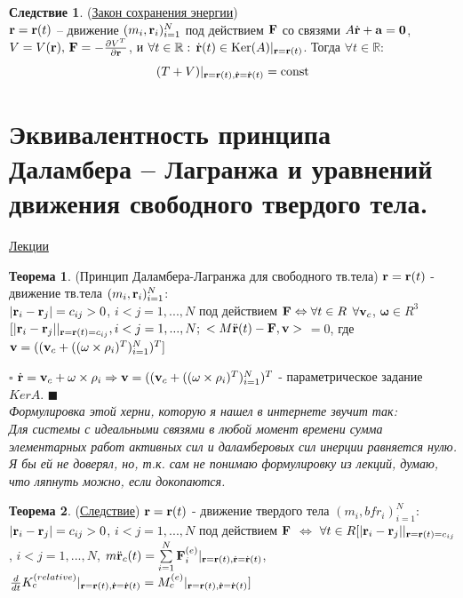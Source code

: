 \documentclass[specialist, subf, href, colorlinks=true, 12pt, times, mtpro, final]{disser}
\theoremstyle{definition}
\newtheorem{theorem}{Теорема}[section]
\newtheorem{consequence}{Следствие}[section]
\def\note{\textcolor{faded}}
\def\const{\text{const}}
\def\Ker{\text{Ker}}
\def\bfrd{\dot{\bfr}}
\def\bfomega{\mathbf{\omega}}
\def\bfrho{\mathbf{\rho}}
\def\bfzero{\mathbf{0}}
\begin{document}
    \begin{consequence} (\hyperlink{first_lects.26}{Закон сохранения энергии})\\
    $\mathbf{r}=\mathbf{r}(t)$ -- движение $(m_i, \mathbf{r}_i)_{i=1}^N$ под действием $\mathbf{F}$ со
    связями $A\bfrd+\bfa=\bfzero$, $V=V(\mathbf{r}),\, \mathbf{F}=-\frac{\partial V^T}{\partial\mathbf{r}}$,
    и $\forall t\in\mathbb{R}:\, \bfrd(t)\in\Ker(A)|_{\bfr=\bfr(t)}$. Тогда $\forall t\in\mathbb{R}$:
    $$
    (T+V)|_{\bfr=\bfr(t),\bfrd=\bfrd(t)} = \const
    $$
    \end{consequence}
    
    \section{Эквивалентность принципа Даламбера – Лагранжа и уравнений движения свободного твердого тела.}
     \label{6}
    \hyperlink {first_lects.27}{Лекции} \\
    
    \begin{theorem} (Принцип Даламбера-Лагранжа для свободного тв.тела)
    $\mathbf{r} = \mathbf{r}(t) $ - движение тв.тела $(m_i, \mathbf{r}_i)^N_{i=1}$:\\
    $|\mathbf{r}_i - \mathbf{r}_j| = c_{ij} > 0$, $i < j = 1, ..., N$ под действием 
    $\mathbf{F} \Leftrightarrow \forall t \in R$  $\forall \mathbf{v}_c$, $\bfomega \in R^3$ $[|\mathbf{r}_i - \mathbf{r}_j| |_{ \mathbf{r}=\mathbf{r}(t)=c_{ij}}, i < j = 1,...,N;$  $<M\ddot{\mathbf{r}}(t) - \mathbf{F}, \mathbf{v}>$ $=0$, 
    где $\bfv = ((\bfv_c + ((\bfomega\times\bfrho_i)^T)^N_{i=1})^T]$
    \end{theorem}    
    
    $\square$
    $\dot{\bfr} = \bfv_c + \bfomega\times\bfrho_i \Rightarrow \bfv = ((\bfv_c + ((\bfomega\times\bfrho_i)^T)^N_{i=1})^T$ - параметрическое задание $KerA$. $\blacksquare$\\
    
    \note{\it Формулировка этой херни, которую я нашел в интернете звучит так:\\ Для системы с идеальными связями в любой момент времени сумма элементарных работ активных сил и даламберовых сил инерции равняется нулю. \\Я бы ей не доверял, но, т.к. сам не понимаю формулировку из лекций, думаю, что ляпнуть можно, если докопаются.}
    
     \begin{theorem} (\hyperlink {first_lects.28}{Следствие})
    $\mathbf{r} = \mathbf{r}(t)$ - движение твердого тела 
    $(m_i, bfr_i)^N_{i=1}$: $|\mathbf{r}_i - \mathbf{r}_j| = c_{ij} > 0$, $i<j = 1,...,N$ 
    под действием $\mathbf{F}$ $\Leftrightarrow$ $\forall t \in R [|\mathbf{r}_i - \mathbf{r}_j| |_{\mathbf{r}=\mathbf{r}(t)=c_{ij}}$,
     $i<j=1,...,N$, $m\ddot{\mathbf{r}}_c(t)=\sum\limits^N_{i=1} \mathbf{F}^{(e)}_i |_{\mathbf{r}=\mathbf{r}(t), \dot{\mathbf{r}}=\dot{\mathbf{r}}(t)}$,
      $\frac{d}{dt}K^{(relative)}_c|_{\mathbf{r}=\mathbf{r}(t), \dot{\mathbf{r}}=\dot{\mathbf{r}}(t)} = M^{(e)}_c |_{\mathbf{r}=\mathbf{r}(t), \dot{\mathbf{r}}=\dot{\mathbf{r}}(t)}]$
      \end{theorem}
     
\end{document}

